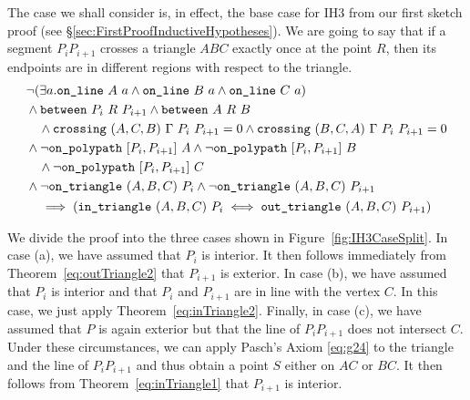The case we shall consider is, in effect, the base case for IH3 from our first sketch proof (see \S\ref{sec:FirstProofInductiveHypotheses}). We are going to say that if a segment $P_iP_{i+1}$ crosses a triangle $ABC$ exactly once at the point $R$, then its endpoints are in different regions with respect to the triangle. 
\begin{multline}\label{eq:IH3}
  \begin{aligned}
    &\neg(\exists a.\texttt{on\_line}\ A\ a\wedge \texttt{on\_line}\ B\ a\wedge \texttt{on\_line}\ C\ a)\\
    &\wedge\texttt{between}\ P_i\ R\ P_{i+1} \wedge \texttt{between}\ A\ R\ B \\
    &\quad\wedge\texttt{crossing}\ (A,C,B)\ \Gamma\ P_i\ P_{i+1} = 0\wedge\texttt{crossing}\ (B,C,A)\ \Gamma\ P_i\ P_{i+1} = 0\\
    &\wedge\neg\texttt{on\_polypath}\ [P_i,P_{i+1}]\ A \wedge \neg\texttt{on\_polypath}\ [P_i,P_{i+1}]\ B \\
    &\quad\wedge \neg\texttt{on\_polypath}\ [P_i,P_{i+1}]\ C\\
    &\wedge\neg\texttt{on\_triangle}\ (A,B,C)\ P_i \wedge\neg\texttt{on\_triangle}\ (A,B,C)\ P_{i+1}
  \end{aligned}\\
  \implies\left(\texttt{in\_triangle}\ (A,B,C)\ P_i \iff \texttt{out\_triangle}\ (A,B,C)\ P_{i+1}\right)
\end{multline}

We divide the proof into the three cases shown in Figure~\ref{fig:IH3CaseSplit}. In case (a), we have assumed that $P_i$ is interior. It then follows immediately from Theorem~\ref{eq:outTriangle2} that $P_{i+1}$ is exterior. In case (b), we have assumed that $P_i$ is interior and that $P_i$ and $P_{i+1}$ are in line with the vertex $C$. In this case, we just apply Theorem~\ref{eq:inTriangle2}. Finally, in case (c), we have assumed that $P$ is again exterior but that the line of $P_iP_{i+1}$ does not intersect $C$. Under these circumstances, we can apply Pasch's Axiom \eqref{eq:g24} to the triangle and the line of $P_iP_{i+1}$ and thus obtain a point $S$ either on $AC$ or $BC$. It then follows from Theorem~\ref{eq:inTriangle1} that $P_{i+1}$ is interior.

